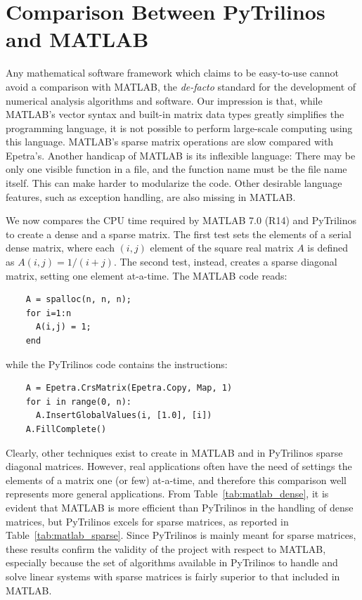 \documentclass[10pt,relax]{SANDreport}
\begin{document}
\section{Comparison Between PyTrilinos and MATLAB}
\label{sec:comparison_matlab}

Any mathematical software framework which
claims to be easy-to-use cannot avoid a comparison with MATLAB, the
{\sl de-facto} standard for the development of numerical analysis
algorithms and software. Our impression is that, while MATLAB's
vector syntax and built-in matrix data types greatly simplifies the
programming language, it is not possible to perform large-scale
computing using this language. MATLAB's sparse matrix operations are
slow compared with Epetra's. Another handicap of MATLAB is its
inflexible language: There may be only one visible function in a
file, and the function name must be the file name itself. This can
make harder to modularize the code.  Other desirable language
features, such as exception handling, are also missing in MATLAB.

We now compares the CPU time required by MATLAB 7.0 (R14) and
PyTrilinos to create a dense and a sparse matrix.
The first test sets the elements
of a serial dense matrix, where each $(i,j)$ element of the square real
matrix $A$ is defined as $A(i,j) = 1/(i + j)$. The second test,
instead, creates a sparse diagonal matrix, setting one element
at-a-time. The MATLAB code reads:
\begin{verbatim}
    A = spalloc(n, n, n);
    for i=1:n
      A(i,j) = 1;
    end
\end{verbatim}
while the PyTrilinos code contains the instructions:
\begin{verbatim}
    A = Epetra.CrsMatrix(Epetra.Copy, Map, 1)
    for i in range(0, n):
      A.InsertGlobalValues(i, [1.0], [i])
    A.FillComplete()
\end{verbatim}
Clearly, other techniques exist to create in MATLAB and in
PyTrilinos sparse diagonal matrices. However, real applications
often have the need of settings the elements of a matrix one (or
few) at-a-time, and therefore this comparison well represents more
general applications. From Table~\ref{tab:matlab_dense},
  it is evident that MATLAB is more efficient than PyTrilinos in the handling
  of dense matrices, but PyTrilinos excels for sparse matrices, as reported in
  Table~\ref{tab:matlab_sparse}. Since PyTrilinos is mainly meant for sparse
  matrices, these results confirm the validity of the project with respect to
  MATLAB, especially because the set of algorithms available in PyTrilinos to
  handle and solve linear systems with sparse matrices is fairly superior to
  that included in MATLAB.
\end{document}
